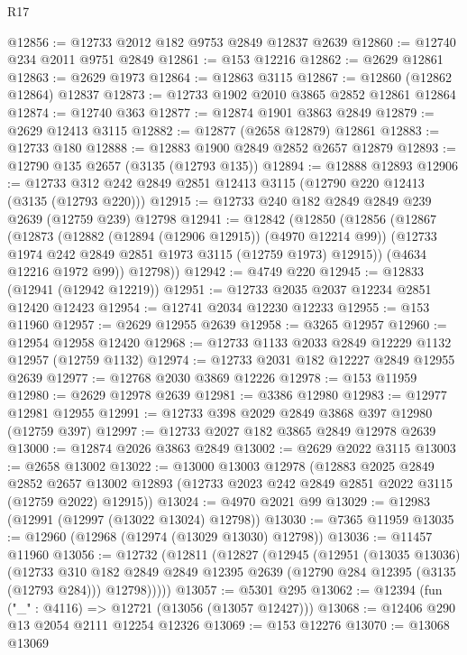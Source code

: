 \begin{lexlean}{R17}
\begin{coremodule}
@12856 := @12733 @2012 @182 @9753 @2849 @12837 @2639
@12860 := @12740 @234 @2011 @9751 @2849
@12861 := @153 @12216
@12862 := @2629 @12861
@12863 := @2629 @1973
@12864 := @12863 @3115
@12867 := @12860 (@12862 @12864) @12837
@12873 := @12733 @1902 @2010 @3865 @2852 @12861 @12864
@12874 := @12740 @363
@12877 := @12874 @1901 @3863 @2849
@12879 := @2629 @12413 @3115
@12882 := @12877 (@2658 @12879) @12861
@12883 := @12733 @180
@12888 := @12883 @1900 @2849 @2852 @2657 @12879
@12893 := @12790 @135 @2657 (@3135 (@12793 @135))
@12894 := @12888 @12893
@12906 := @12733 @312 @242 @2849 @2851 @12413 @3115 (@12790 @220 @12413 (@3135 (@12793 @220)))
@12915 := @12733 @240 @182 @2849 @2849 @239 @2639 (@12759 @239) @12798
@12941 := @12842
    (@12850
      (@12856
        (@12867
          (@12873
            (@12882 (@12894 (@12906 @12915)) (@4970 @12214 @99))
            (@12733 @1974 @242 @2849 @2851 @1973 @3115 (@12759 @1973) @12915))
          (@4634 @12216 @1972 @99))
        @12798))
@12942 := @4749 @220
@12945 := @12833 (@12941 (@12942 @12219))
@12951 := @12733 @2035 @2037 @12234 @2851 @12420 @12423
@12954 := @12741 @2034 @12230 @12233
@12955 := @153 @11960
@12957 := @2629 @12955 @2639
@12958 := @3265 @12957
@12960 := @12954 @12958 @12420
@12968 := @12733 @1133 @2033 @2849 @12229 @1132 @12957 (@12759 @1132)
@12974 := @12733 @2031 @182 @12227 @2849 @12955 @2639
@12977 := @12768 @2030 @3869 @12226
@12978 := @153 @11959
@12980 := @2629 @12978 @2639
@12981 := @3386 @12980
@12983 := @12977 @12981 @12955
@12991 := @12733 @398 @2029 @2849 @3868 @397 @12980 (@12759 @397)
@12997 := @12733 @2027 @182 @3865 @2849 @12978 @2639
@13000 := @12874 @2026 @3863 @2849
@13002 := @2629 @2022 @3115
@13003 := @2658 @13002
@13022 := @13000
    @13003
    @12978
    (@12883
      @2025
      @2849
      @2852
      @2657
      @13002
      @12893
      (@12733 @2023 @242 @2849 @2851 @2022 @3115 (@12759 @2022) @12915))
@13024 := @4970 @2021 @99
@13029 := @12983 (@12991 (@12997 (@13022 @13024) @12798))
@13030 := @7365 @11959
@13035 := @12960 (@12968 (@12974 (@13029 @13030) @12798))
@13036 := @11457 @11960
@13056 := @12732
    (@12811
      (@12827
        (@12945
          (@12951
            (@13035 @13036)
            (@12733
              @310
              @182
              @2849
              @2849
              @12395
              @2639
              (@12790 @284 @12395 (@3135 (@12793 @284)))
              @12798)))))
@13057 := @5301 @295
@13062 := @12394 (fun ("_" : @4116) => @12721 (@13056 (@13057 @12427)))
@13068 := @12406 @290 @13 @2054 @2111 @12254 @12326
@13069 := @153 @12276
@13070 := @13068 @13069

\end{coremodule}
\end{lexlean}
